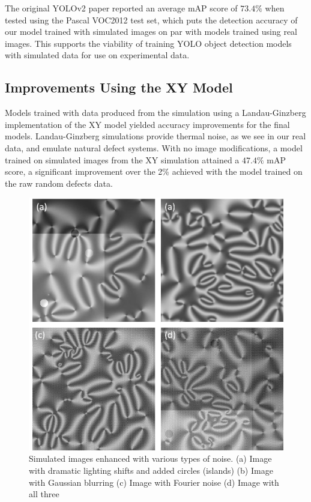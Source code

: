 \documentclass[prl,reprint,showpacs,floatfix,nofootinbib]{revtex4-1}
\begin{document}
The original YOLOv2 \cite{redmon_yolo9000:_2016} paper reported an average mAP score of $73.4\%$ when tested using the Pascal VOC2012 test set, which puts the detection accuracy of our model trained with simulated images on par with models trained using real images. This supports the viability of training YOLO object detection models with simulated data for use on experimental data.

\subsection{Improvements Using the XY Model}
Models trained with data produced from the simulation using a Landau-Ginzberg implementation of the XY model yielded accuracy improvements for the final models. Landau-Ginzberg simulations provide thermal noise, as we see in our real data, and emulate natural defect systems. With no image modifications, a model trained on simulated images from the XY simulation attained a $47.4\%$ mAP score, a significant improvement over the 2\% achieved with the model trained on the raw random defects data. 
\begin{figure}
  \includegraphics[width=\linewidth*3/4]{imageEnhance.png}
  \caption{Simulated images enhanced with various types of noise. (a) Image with dramatic lighting shifts and added circles (islands) (b) Image with Gaussian blurring (c) Image with Fourier noise (d) Image with all three}
  \label{fig:Image Enhancement}
\end{figure}
\end{document}
